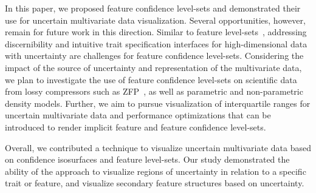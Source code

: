 In this paper, we proposed feature confidence level-sets and demonstrated their use for uncertain multivariate data visualization.
%
Several opportunities, however, remain for future work in this direction.
%
Similar to feature level-sets~\cite{jankowai2020feature}, addressing discernibility and intuitive trait specification interfaces for high-dimensional data with uncertainty are challenges for feature confidence level-sets.
%
Considering the impact of the source of uncertainty and representation of the multivariate data, we plan to investigate the use of feature confidence level-sets on scientific data from lossy compressors such as ZFP~\cite{lindstrom2014fixed}, as well as parametric and non-parametric density models. 
%
Further, we aim to pursue visualization of interquartile ranges for uncertain multivariate data and performance optimizations that can be introduced to render implicit feature and feature confidence level-sets.
%

%

Overall, we contributed a technique to visualize uncertain multivariate data based on confidence isosurfaces and feature level-sets.
%
Our study demonstrated the ability of the approach to visualize regions of uncertainty in relation to a specific trait or feature, and visualize secondary feature structures based on uncertainty.
